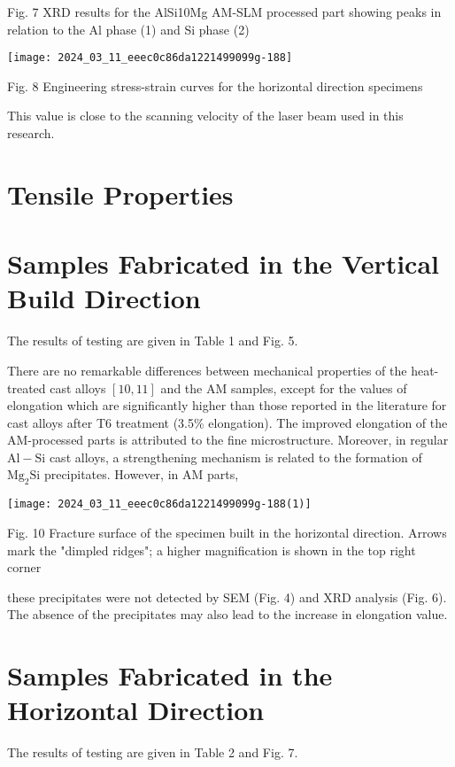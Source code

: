\documentclass[10pt]{article}
\begin{document}
Fig. 7 XRD results for the AlSi10Mg AM-SLM processed part showing peaks in relation to the Al phase (1) and Si phase (2)

\begin{center}
\texttt{[image: 2024\_03\_11\_eeec0c86da1221499099g-188]}
\end{center}

Fig. 8 Engineering stress-strain curves for the horizontal direction specimens

This value is close to the scanning velocity of the laser beam used in this research.

\section*{Tensile Properties}
\section*{Samples Fabricated in the Vertical Build Direction}
The results of testing are given in Table 1 and Fig. 5.

There are no remarkable differences between mechanical properties of the heat-treated cast alloys $[10,11]$ and the AM samples, except for the values of elongation which are significantly higher than those reported in the literature for cast alloys after T6 treatment (3.5\% elongation). The improved elongation of the AM-processed parts is attributed to the fine microstructure. Moreover, in regular $\mathrm{Al}-\mathrm{Si}$ cast alloys, a strengthening mechanism is related to the formation of $\mathrm{Mg}_{2} \mathrm{Si}$ precipitates. However, in $\mathrm{AM}$ parts,

\begin{center}
\texttt{[image: 2024\_03\_11\_eeec0c86da1221499099g-188(1)]}
\end{center}

Fig. 10 Fracture surface of the specimen built in the horizontal direction. Arrows mark the "dimpled ridges"; a higher magnification is shown in the top right corner

these precipitates were not detected by SEM (Fig. 4) and XRD analysis (Fig. 6). The absence of the precipitates may also lead to the increase in elongation value.

\section*{Samples Fabricated in the Horizontal Direction}
The results of testing are given in Table 2 and Fig. 7.
\end{document}

